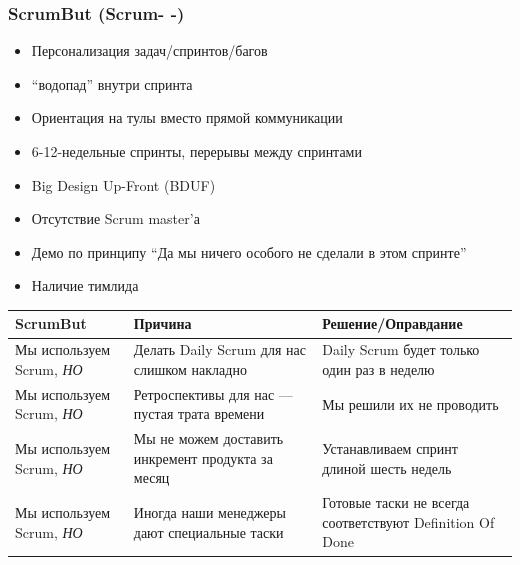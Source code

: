 \documentclass{../../slides-style}
\begin{document}
    \begin{frame}
        \frametitle{ScrumBut (Scrum- -)}
        \begin{itemize}
            \item Персонализация задач/спринтов/багов
            \item ``водопад'' внутри спринта
            \item Ориентация на тулы вместо прямой коммуникации
            \item 6-12-недельные спринты, перерывы между спринтами
            \item Big Design Up-Front (BDUF)
            \item Отсутствие Scrum master’а
            \item Демо по принципу ``Да мы ничего особого не сделали в этом спринте''
            \item Наличие тимлида
        \end{itemize}
        \begin{scriptsize}
            \begin{center}
                \begin{tabularx}{\textwidth} { 
                    | >{\centering\arraybackslash}X 
                    | >{\centering\arraybackslash}X 
                    | >{\centering\arraybackslash}X | }
                    \hline
                    ScrumBut                       & Причина                                           & Решение/Оправдание \\
                    \hline
                    Мы используем Scrum, \emph{НО} & Делать Daily Scrum для нас слишком накладно       & Daily Scrum будет только один раз в неделю               \\
                    \hline
                    Мы используем Scrum, \emph{НО} & Ретроспективы для нас --- пустая трата времени    & Мы решили их не проводить                                \\
                    \hline
                    Мы используем Scrum, \emph{НО} & Мы не можем доставить инкремент продукта за месяц & Устанавливаем спринт длиной шесть недель                 \\
                    \hline
                    Мы используем Scrum, \emph{НО} & Иногда наши менеджеры дают специальные таски      & Готовые таски не всегда соответствуют Definition Of Done \\
                    \hline
                \end{tabularx}
            \end{center}
        \end{scriptsize}
    \end{frame}
\end{document}
